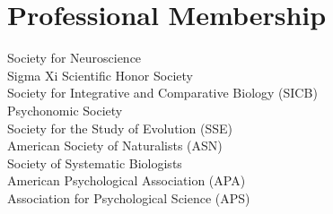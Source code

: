 \section*{Professional Membership}
\years{2022 \textendash}Society for Neuroscience\\ 
\years{2021 \textendash}Sigma Xi Scientific Honor Society\\
Society for Integrative and Comparative Biology (SICB)\\
Psychonomic Society\\
\years{2019 \textendash}Society for the Study of Evolution (SSE)\\
\years{2019 \textendash}American Society of Naturalists (ASN)\\
\years{2019 \textendash}Society of Systematic Biologists\\
\years{2018 \textendash}American Psychological Association (APA)\\
\years{2018 \textendash}Association for Psychological Science (APS)